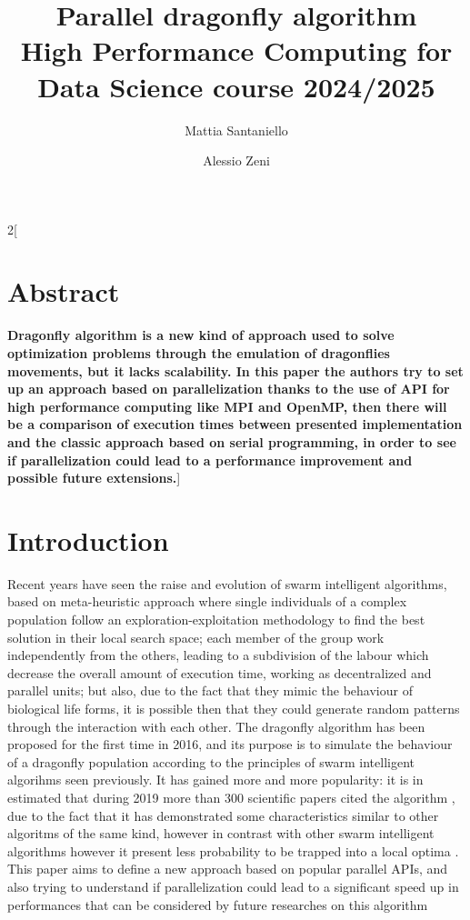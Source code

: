 \documentclass[10pt]{article}
\title{\textbf{Parallel dragonfly algorithm} %
  \\[2ex] \large High Performance Computing for Data Science course 2024/2025}
\author[1]{Mattia Santaniello}
\author[2]{Alessio Zeni}
\affil{University of Trento}
\begin{document}
\maketitle

\begin{multicols}{2}[
  \fontsize{9}{9}
  \section*{Abstract}
  \textbf{Dragonfly algorithm is a new kind of approach used to solve optimization problems through the emulation of dragonflies movements, but it lacks scalability. In this paper the authors try to set up an approach based on parallelization thanks to the use of API for high performance computing like MPI and OpenMP, then there will be a comparison of execution times between presented implementation and the classic approach based on serial programming, in order to see if parallelization could lead to a performance improvement and possible future extensions.}\newline]

\section{Introduction}

Recent years have seen the raise and evolution of swarm intelligent algorithms, based on meta-heuristic approach where single individuals of a complex population follow an exploration-exploitation methodology to find the best solution in their local search space;
each member of the group work independently from the others, leading to a subdivision of the labour which decrease the overall amount of execution time, working as decentralized and parallel units; but also, due to the fact that they mimic the behaviour of biological life forms, it is possible then that they could generate random patterns through the interaction with each other. 
The dragonfly algorithm has been proposed for the first time in 2016, and its purpose is to simulate the behaviour of a dragonfly population according to the principles of swarm intelligent algorihms seen previously.
It has gained more and more popularity: it is in estimated that during 2019 more than 300 scientific papers cited the algorithm \cite{DASurvey}, due to the fact that it has demonstrated some characteristics similar to other algoritms of the same kind, however in contrast with other swarm intelligent algorithms however it present less probability to be trapped into a local optima \cite{DAReview}.
This paper aims to define a new approach based on popular parallel APIs, and also trying to understand if parallelization could lead to a significant speed up in performances that can be considered by future researches on this algorithm 


\end{multicols}
\end{document}
